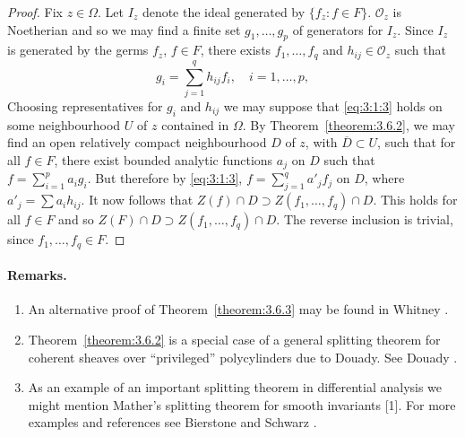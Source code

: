 \begin{proof}
Fix $z\in\Omega$. Let $I_z$ denote the ideal generated by $\{f_z:f\in F\}$. $\mathcal O_z$ is Noetherian and so we may find a finite set $g_1,\ldots,g_p$ of generators for $I_z$. Since $I_z$ is generated by the germs $f_z$, $f\in F$, there exists $f_1,\ldots,f_q$ and $h_{ij}\in\mathcal O_z$ such that
\begin{equation}g_i=\sum_{j=1}^q h_{ij}f_i,\quad i=1,\ldots,p,\tag{1}\label{eq:3:1:3}\end{equation}
Choosing representatives for $g_i$ and $h_{ij}$ we may suppose that \eqref{eq:3:1:3} holds on some neighbourhood $U$ of $z$ contained in $\Omega$. By Theorem~\ref{theorem:3.6.2}, we may find an open relatively compact neighbourhood $D$ of $z$, with $\overline D\subset U$, such that for all $f\in F$, there exist bounded analytic functions $a_j$ on $D$ such that $f=\sum_{i=1}^p a_ig_i$. But therefore by \eqref{eq:3:1:3}, $f=\sum_{j=1}^q a'_jf_j$ on $D$, where $a'_j=\sum a_ih_{ij}$. It now follows that $Z(f)\cap D\supset Z(f_1,\ldots,f_q)\cap D$. This holds for all $f\in F$ and so $Z(F)\cap D\supset Z(f_1,\ldots,f_q)\cap D$. The reverse inclusion is trivial, since $f_1,\ldots,f_q\in F$.
\end{proof}
\paragraph*{Remarks.}
\begin{enumerate}
\item An alternative proof of Theorem~\ref{theorem:3.6.3} may be found in Whitney \cite[page 100]{bib:I:whitney-h:1}.
\item Theorem~\ref{theorem:3.6.2} is a special case of a general splitting theorem for coherent sheaves over ``privileged'' polycylinders due to Douady. See Douady \cite{bib:I:douady-a:1,bib:I:douady-a:2}.
\item As an example of an important splitting theorem in differential analysis we might mention Mather's splitting theorem for smooth invariants [1]. For more examples and references see Bierstone and Schwarz \cite{bib:I:bierstone-e-and-schwartz-g-w:1}.
\end{enumerate}
